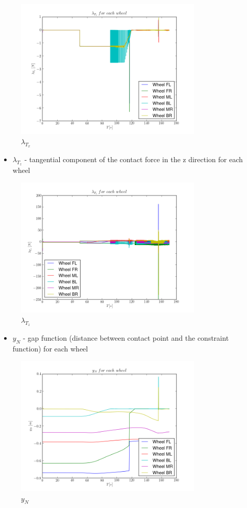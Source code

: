 \begin{figure}[H]
  \centering
    \includegraphics[width=0.8\textwidth]{lambdaTx8}
  \caption{$\lambda_{T_x}$}
\end{figure}

\begin{itemize}
  \item $\lambda_{T_z}$ - tangential component of the contact force in the z direction for each wheel
\end{itemize}

\begin{figure}[H]
  \centering
    \includegraphics[width=0.8\textwidth]{lambdaTz8}
  \caption{$\lambda_{T_z}$}
\end{figure}

\begin{itemize}
  \item $y_{N}$ - gap function (distance between contact point and the constraint function) for each wheel
\end{itemize}

\begin{figure}[H]
  \centering
    \includegraphics[width=0.8\textwidth]{yN8}
  \caption{$y_N$}
\end{figure}

